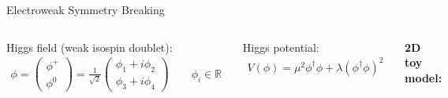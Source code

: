 \documentclass[11pt, xcolor={dvipsnames}, aspectratio=169]{beamer}
\begin{document}
\begin{frame}{Electroweak Symmetry Breaking}

  \begin{columns}[onlytextwidth]

    Higgs field (weak isospin doublet):
    \begin{align*}
      \phi =
      \begin{pmatrix}
        \phi^+ \\
        \phi^0
      \end{pmatrix}
      =  \frac{1}{\sqrt{2}}
      \begin{pmatrix}
        \phi_1 + i \phi_2\\
        \phi_3 + i \phi_4
      \end{pmatrix}
      \qquad \phi_i \in \mathbb{R}
    \end{align*}


    Higgs potential:
    \begin{align*}
      V(\phi) = \mu^2 \phi^\dag \phi + \lambda (\phi^\dag \phi)^2
    \end{align*}


    \centering

    \textbf{2D toy model:}

\end{columns}
\end{frame}
\end{document}
